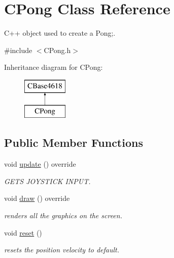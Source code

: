 \hypertarget{class_c_pong}{}\section{C\+Pong Class Reference}
\label{class_c_pong}


C++ object used to create a Pong;.  




{\ttfamily \#include $<$C\+Pong.\+h$>$}

Inheritance diagram for C\+Pong\+:\begin{figure}[H]
\begin{center}
\leavevmode
\includegraphics[height=2.000000cm]{class_c_pong}
\end{center}
\end{figure}
\subsection*{Public Member Functions}
\begin{DoxyCompactItemize}
\item 
void \hyperlink{class_c_pong_a819c9942552ff12a11be284a89e3ab12}{update} () override
\begin{DoxyCompactList}\small\item\em G\+E\+TS J\+O\+Y\+S\+T\+I\+CK I\+N\+P\+UT. \end{DoxyCompactList}\item 
void \hyperlink{class_c_pong_af43dbb61f1f1addd6920b01aeca3fa63}{draw} () override
\begin{DoxyCompactList}\small\item\em renders all the graphics on the screen. \end{DoxyCompactList}\item 
void \hyperlink{class_c_pong_a0fa724d6d3dc8e65decb1276a4a1c38a}{reset} ()
\begin{DoxyCompactList}\small\item\em resets the position velocity to default. \end{DoxyCompactList}\end{DoxyCompactItemize}
